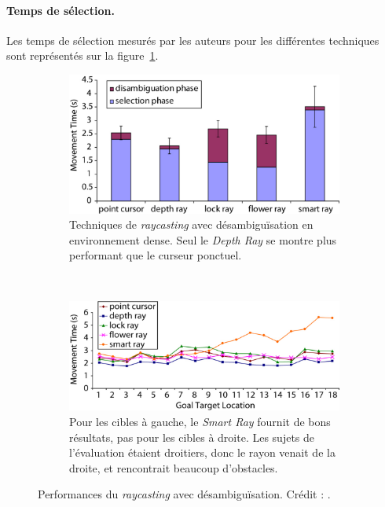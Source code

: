 	\paragraph{Temps de sélection.}
	
	Les temps de sélection mesurés par les auteurs pour les différentes techniques sont représentés sur la figure~\ref{fig:rayTimes}.
	
	\begin{figure}[!htbp]
		\begin{subfigure}[t]{0.42\textwidth}
			\centering
			\includegraphics[width=\textwidth]{figures/ch2/rayTimes}
			\caption{Techniques de \emph{raycasting} avec désambiguïsation en environnement dense. Seul le \emph{Depth Ray} se montre plus performant que le curseur ponctuel.}
			\label{fig:rayTimes}
		\end{subfigure}
		~
		\begin{subfigure}[t]{0.56\textwidth}
			\centering
			\includegraphics[width=\textwidth]{figures/ch2/smartRayLocation}
			\caption{Pour les cibles à gauche, le \emph{Smart Ray} fournit de bons résultats, pas pour les cibles à droite. Les sujets de l'évaluation étaient droitiers, donc le rayon venait de la droite, et rencontrait beaucoup d'obstacles.}
			\label{fig:smartRayLocation}
		\end{subfigure}
		\caption[Performances du \emph{raycasting} avec désambiguïsation]{Performances du \emph{raycasting} avec désambiguïsation. Crédit : \cite{grossman2006design}.}
		\label{fig:rayPerf}
	\end{figure}

